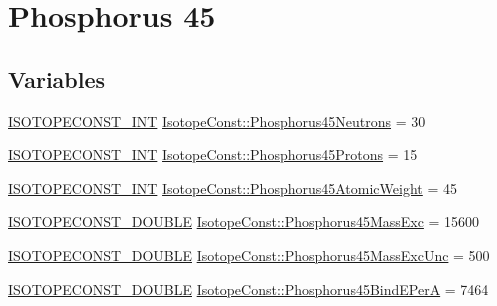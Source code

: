 \hypertarget{group___isotope_const-_phosphorus-_p45}{}\section{Phosphorus 45}
\label{group___isotope_const-_phosphorus-_p45}
\subsection*{Variables}
\begin{DoxyCompactItemize}
\item 
\mbox{\hyperlink{group___isotope_const-_macros_ga5f18360b3e99483a35c32d789e62621c}{I\+S\+O\+T\+O\+P\+E\+C\+O\+N\+S\+T\+\_\+\+I\+NT}} \mbox{\hyperlink{group___isotope_const-_phosphorus-_p45_ga0aba2722c31724c62fcc38f383752d89}{Isotope\+Const\+::\+Phosphorus45\+Neutrons}} = 30
\item 
\mbox{\hyperlink{group___isotope_const-_macros_ga5f18360b3e99483a35c32d789e62621c}{I\+S\+O\+T\+O\+P\+E\+C\+O\+N\+S\+T\+\_\+\+I\+NT}} \mbox{\hyperlink{group___isotope_const-_phosphorus-_p45_gaa96df5730ba3596841d91fc098b5cb03}{Isotope\+Const\+::\+Phosphorus45\+Protons}} = 15
\item 
\mbox{\hyperlink{group___isotope_const-_macros_ga5f18360b3e99483a35c32d789e62621c}{I\+S\+O\+T\+O\+P\+E\+C\+O\+N\+S\+T\+\_\+\+I\+NT}} \mbox{\hyperlink{group___isotope_const-_phosphorus-_p45_gae8668e749b5d4a6b706bc60ebf3082e4}{Isotope\+Const\+::\+Phosphorus45\+Atomic\+Weight}} = 45
\item 
\mbox{\hyperlink{group___isotope_const-_macros_ga8f45a7272ce02c0b4c65c44636ed719a}{I\+S\+O\+T\+O\+P\+E\+C\+O\+N\+S\+T\+\_\+\+D\+O\+U\+B\+LE}} \mbox{\hyperlink{group___isotope_const-_phosphorus-_p45_ga1be051c39c9fe359ad1b371ecaeff3f4}{Isotope\+Const\+::\+Phosphorus45\+Mass\+Exc}} = 15600
\item 
\mbox{\hyperlink{group___isotope_const-_macros_ga8f45a7272ce02c0b4c65c44636ed719a}{I\+S\+O\+T\+O\+P\+E\+C\+O\+N\+S\+T\+\_\+\+D\+O\+U\+B\+LE}} \mbox{\hyperlink{group___isotope_const-_phosphorus-_p45_ga407e91ed0b8848f6bc2aab3f0b5ebe42}{Isotope\+Const\+::\+Phosphorus45\+Mass\+Exc\+Unc}} = 500
\item 
\mbox{\hyperlink{group___isotope_const-_macros_ga8f45a7272ce02c0b4c65c44636ed719a}{I\+S\+O\+T\+O\+P\+E\+C\+O\+N\+S\+T\+\_\+\+D\+O\+U\+B\+LE}} \mbox{\hyperlink{group___isotope_const-_phosphorus-_p45_ga04de42e2535d2f4c3662c6af890fac27}{Isotope\+Const\+::\+Phosphorus45\+Bind\+E\+PerA}} = 7464
\item 

\end{DoxyCompactItemize}
